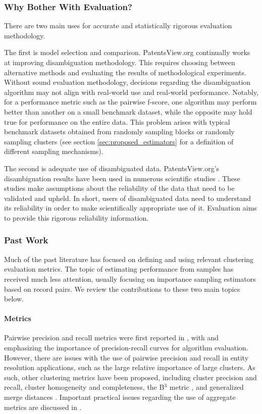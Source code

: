 \documentclass[fontsize=11pt]{article}
\theoremstyle{definition}
\begin{document}
\subsubsection{Why Bother With Evaluation?}

There are two main uses for accurate and statistically rigorous evaluation methodology.

The first is model selection and comparison. PatentsView.org continually works at improving disambiguation methodology. This requires choosing between alternative methods and evaluating the results of methodological experiments. Without sound evaluation methodology, decisions regarding the disambiguation algorithm may not align with real-world use and real-world performance. Notably, for a performance metric such as the pairwise f-score, one algorithm may perform better than another on a small benchmark dataset, while the opposite may hold true for performance on the entire data. This problem arises with typical benchmark datasets obtained from randomly sampling blocks or randomly sampling clusters (see section \ref{sec:proposed_estimators} for a definition of different sampling mechanisms).

The second is adequate use of disambiguated data. PatentsView.org's disambiguation results have been used in numerous scientific studies \citep{toole2021patentsview}. These studies make assumptions about the reliability of the data that need to be validated and upheld. In short, users of disambiguated data need to understand its reliability in order to make scientifically appropriate use of it. Evaluation aims to provide this rigorous reliability information.

\subsubsection{Past Work}

Much of the past literature has focused on defining and using relevant clustering evaluation metrics. The topic of estimating performance from samples has received much less attention, usually focusing on importance sampling estimators based on record pairs. We review the contributions to these two main topics below.

\paragraph{Metrics}

Pairwise precision and recall metrics were first reported in \cite{Newcombe1959}, with \cite{Bilenko2003} and \cite{Christen2007} emphasizing the importance of precision-recall curves for algorithm evaluation. However, there are issues with the use of pairwise precision and recall in entity resolution applications, such as the large relative importance of large clusters. As such, other clustering metrics have been proposed, including cluster precision and recall, cluster homogeneity and completeness, the B$^3$ metric \citep{bagga1998algorithms}, and generalized merge distances \citep{Michelson2009, Menestrina2010, Maidasani2012, Barnes2015}. Important practical issues regarding the use of aggregate metrics are discussed in \cite{Hand2018}.
\end{document}
